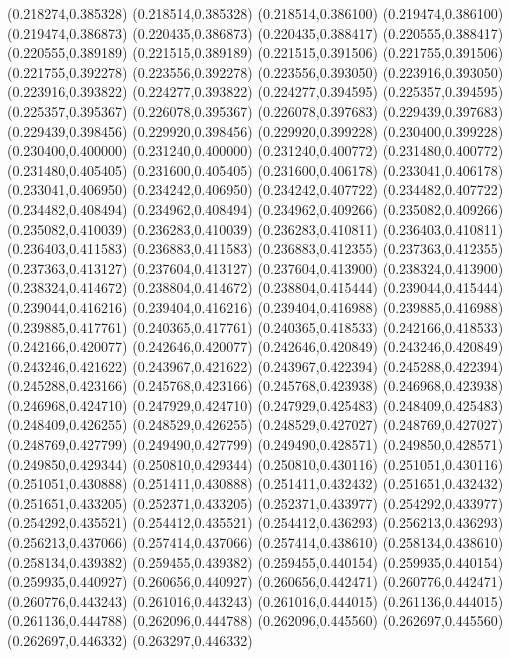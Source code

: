 (0.218274,0.385328)
(0.218514,0.385328)
(0.218514,0.386100)
(0.219474,0.386100)
(0.219474,0.386873)
(0.220435,0.386873)
(0.220435,0.388417)
(0.220555,0.388417)
(0.220555,0.389189)
(0.221515,0.389189)
(0.221515,0.391506)
(0.221755,0.391506)
(0.221755,0.392278)
(0.223556,0.392278)
(0.223556,0.393050)
(0.223916,0.393050)
(0.223916,0.393822)
(0.224277,0.393822)
(0.224277,0.394595)
(0.225357,0.394595)
(0.225357,0.395367)
(0.226078,0.395367)
(0.226078,0.397683)
(0.229439,0.397683)
(0.229439,0.398456)
(0.229920,0.398456)
(0.229920,0.399228)
(0.230400,0.399228)
(0.230400,0.400000)
(0.231240,0.400000)
(0.231240,0.400772)
(0.231480,0.400772)
(0.231480,0.405405)
(0.231600,0.405405)
(0.231600,0.406178)
(0.233041,0.406178)
(0.233041,0.406950)
(0.234242,0.406950)
(0.234242,0.407722)
(0.234482,0.407722)
(0.234482,0.408494)
(0.234962,0.408494)
(0.234962,0.409266)
(0.235082,0.409266)
(0.235082,0.410039)
(0.236283,0.410039)
(0.236283,0.410811)
(0.236403,0.410811)
(0.236403,0.411583)
(0.236883,0.411583)
(0.236883,0.412355)
(0.237363,0.412355)
(0.237363,0.413127)
(0.237604,0.413127)
(0.237604,0.413900)
(0.238324,0.413900)
(0.238324,0.414672)
(0.238804,0.414672)
(0.238804,0.415444)
(0.239044,0.415444)
(0.239044,0.416216)
(0.239404,0.416216)
(0.239404,0.416988)
(0.239885,0.416988)
(0.239885,0.417761)
(0.240365,0.417761)
(0.240365,0.418533)
(0.242166,0.418533)
(0.242166,0.420077)
(0.242646,0.420077)
(0.242646,0.420849)
(0.243246,0.420849)
(0.243246,0.421622)
(0.243967,0.421622)
(0.243967,0.422394)
(0.245288,0.422394)
(0.245288,0.423166)
(0.245768,0.423166)
(0.245768,0.423938)
(0.246968,0.423938)
(0.246968,0.424710)
(0.247929,0.424710)
(0.247929,0.425483)
(0.248409,0.425483)
(0.248409,0.426255)
(0.248529,0.426255)
(0.248529,0.427027)
(0.248769,0.427027)
(0.248769,0.427799)
(0.249490,0.427799)
(0.249490,0.428571)
(0.249850,0.428571)
(0.249850,0.429344)
(0.250810,0.429344)
(0.250810,0.430116)
(0.251051,0.430116)
(0.251051,0.430888)
(0.251411,0.430888)
(0.251411,0.432432)
(0.251651,0.432432)
(0.251651,0.433205)
(0.252371,0.433205)
(0.252371,0.433977)
(0.254292,0.433977)
(0.254292,0.435521)
(0.254412,0.435521)
(0.254412,0.436293)
(0.256213,0.436293)
(0.256213,0.437066)
(0.257414,0.437066)
(0.257414,0.438610)
(0.258134,0.438610)
(0.258134,0.439382)
(0.259455,0.439382)
(0.259455,0.440154)
(0.259935,0.440154)
(0.259935,0.440927)
(0.260656,0.440927)
(0.260656,0.442471)
(0.260776,0.442471)
(0.260776,0.443243)
(0.261016,0.443243)
(0.261016,0.444015)
(0.261136,0.444015)
(0.261136,0.444788)
(0.262096,0.444788)
(0.262096,0.445560)
(0.262697,0.445560)
(0.262697,0.446332)
(0.263297,0.446332)
